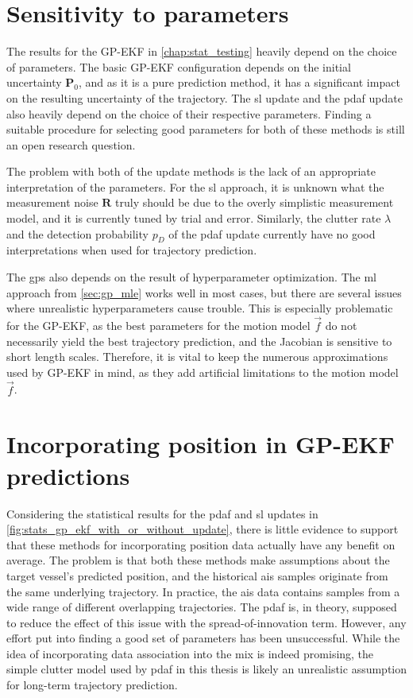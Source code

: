 \section{Sensitivity to parameters}
The results for the GP-EKF in \cref{chap:stat_testing} heavily depend on the choice of parameters. The basic GP-EKF configuration depends on the initial uncertainty $\boldsymbol{P}_0$, and as it is a pure prediction method, it has a significant impact on the resulting uncertainty of the trajectory. The \acrshort{sl} update and the \acrshort{pdaf} update also heavily depend on the choice of their respective parameters. Finding a suitable procedure for selecting good parameters for both of these methods is still an open research question. 

The problem with both of the update methods is the lack of an appropriate interpretation of the parameters. For the \acrshort{sl} approach, it is unknown what the measurement noise $\boldsymbol{R}$ truly should be due to the overly simplistic measurement model, and it is currently tuned by trial and error. Similarly, the clutter rate $\lambda$ and the detection probability $p_D$ of the \acrshort{pdaf} update currently have no good interpretations when used for trajectory prediction. 

The \acrshort{gp}s also depends on the result of hyperparameter optimization. The \acrshort{ml} approach from \cref{sec:gp_mle} works well in most cases, but there are several issues where unrealistic hyperparameters cause trouble. This is especially problematic for the GP-EKF, as the best parameters for the motion model $\vec{f}$ do not necessarily yield the best trajectory prediction, and the Jacobian is sensitive to short length scales. Therefore, it is vital to keep the numerous approximations used by GP-EKF in mind, as they add artificial limitations to the motion model $\vec{f}$.

\section{Incorporating position in GP-EKF predictions}
Considering the statistical results for the \acrshort{pdaf} and \acrshort{sl} updates in \cref{fig:stats_gp_ekf_with_or_without_update}, there is little evidence to support that these methods for incorporating position data actually have any benefit on average. The problem is that both these methods make assumptions about the target vessel's predicted position, and the historical \acrshort{ais} samples originate from the same underlying trajectory. In practice, the \acrshort{ais} data contains samples from a wide range of different overlapping trajectories. The \acrshort{pdaf} is, in theory, supposed to reduce the effect of this issue with the spread-of-innovation term. However, any effort put into finding a good set of parameters has been unsuccessful. While the idea of incorporating data association into the mix is indeed promising, the simple clutter model used by \acrshort{pdaf} in this thesis is likely an unrealistic assumption for long-term trajectory prediction. 

